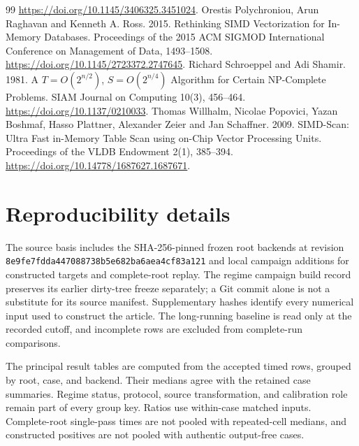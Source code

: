 \documentclass[manuscript,screen,review]{acmart}
\begin{document}
\begin{thebibliography}{99}
\url{https://doi.org/10.1145/3406325.3451024}.
Orestis Polychroniou, Arun Raghavan and Kenneth A. Ross. 2015. Rethinking SIMD Vectorization for In-Memory Databases. Proceedings of the 2015 ACM SIGMOD International Conference on Management of Data, 1493–1508.
\url{https://doi.org/10.1145/2723372.2747645}.
Richard Schroeppel and Adi Shamir. 1981. A $T=O(2^{n/2})$, $S=O(2^{n/4})$ Algorithm for Certain NP-Complete Problems. SIAM Journal on Computing 10(3), 456–464.
\url{https://doi.org/10.1137/0210033}.
Thomas Willhalm, Nicolae Popovici, Yazan Boshmaf, Hasso Plattner, Alexander Zeier and Jan Schaffner. 2009. SIMD-Scan: Ultra Fast in-Memory Table Scan using on-Chip Vector Processing Units. Proceedings of the VLDB Endowment 2(1), 385–394.
\url{https://doi.org/10.14778/1687627.1687671}.
\end{thebibliography}
\clearpage
\appendix
\section{Reproducibility details}
The source basis includes the SHA-256-pinned frozen root backends at revision \texttt{8e9fe7fd\allowbreak{}da447088\allowbreak{}738b5e68\allowbreak{}2ba6aea4\allowbreak{}cf83a121} and local campaign additions for constructed targets and complete-root replay. The regime campaign build record preserves its earlier dirty-tree freeze separately; a Git commit alone is not a substitute for its source manifest. Supplementary hashes identify every numerical input used to construct the article. The long-running baseline is read only at the recorded cutoff, and incomplete rows are excluded from complete-run comparisons.

The principal result tables are computed from the accepted timed rows, grouped by root, case, and backend. Their medians agree with the retained case summaries. Regime status, protocol, source transformation, and calibration role remain part of every group key. Ratios use within-case matched inputs. Complete-root single-pass times are not pooled with repeated-cell medians, and constructed positives are not pooled with authentic output-free cases.
\end{document}

